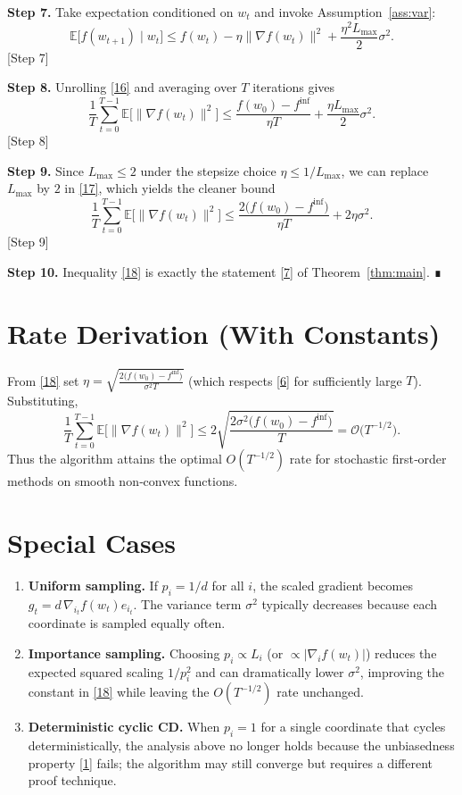 \documentclass[11pt]{article}
\newcommand{\E}{\mathbb{E}}
\begin{document}
\noindent\textbf{Step 7.}  Take expectation conditioned on $w_t$ and invoke
Assumption~\ref{ass:var}:
\[
\E\!\bigl[f(w_{t+1})\mid w_t\bigr]
\le f(w_t)-\eta\|\nabla f(w_t)\|^{2}
+\frac{\eta^{2}L_{\max}}{2}\sigma^{2}.
\tag{16}
\]
[Step 7]

\noindent\textbf{Step 8.}  Unrolling \eqref{16} and averaging over $T$ iterations
gives
\[
\frac{1}{T}\sum_{t=0}^{T-1}\E\!\bigl[\|\nabla f(w_t)\|^{2}\bigr]
\le\frac{f(w_0)-f^{\inf}}{\eta T}
+\frac{\eta L_{\max}}{2}\sigma^{2}.
\tag{17}
\]
[Step 8]

\noindent\textbf{Step 9.}  Since $L_{\max}\le 2$ under the stepsize choice
$\eta\le1/L_{\max}$, we can replace $L_{\max}$ by $2$ in \eqref{17},
which yields the cleaner bound
\[
\frac{1}{T}\sum_{t=0}^{T-1}\E\!\bigl[\|\nabla f(w_t)\|^{2}\bigr]
\le\frac{2\bigl(f(w_0)-f^{\inf}\bigr)}{\eta T}+2\eta\sigma^{2}.
\tag{18}
\]
[Step 9]

\noindent\textbf{Step 10.}  Inequality \eqref{18} is exactly the statement
\eqref{7} of Theorem~\ref{thm:main}.  ∎

\section*{Rate Derivation (With Constants)}
From \eqref{18} set $\eta = \sqrt{\frac{2\bigl(f(w_0)-f^{\inf}\bigr)}{\sigma^{2}T}}$
(which respects \eqref{6} for sufficiently large $T$).  Substituting,
\[
\frac{1}{T}\sum_{t=0}^{T-1}\E\!\bigl[\|\nabla f(w_t)\|^{2}\bigr]
\le 2\sqrt{\frac{2\sigma^{2}\bigl(f(w_0)-f^{\inf}\bigr)}{T}}
= \mathcal{O}\!\bigl(T^{-1/2}\bigr).
\tag{19}
\]
Thus the algorithm attains the optimal $O(T^{-1/2})$ rate for stochastic
first‑order methods on smooth non‑convex functions.

\section*{Special Cases}
\begin{enumerate}[leftmargin=*]
\item \textbf{Uniform sampling.}  If $p_i=1/d$ for all $i$, the scaled
gradient becomes $g_t=d\,\nabla_{i_t}f(w_t)e_{i_t}$.  The variance term
$\sigma^{2}$ typically decreases because each coordinate is sampled
equally often.

\item \textbf{Importance sampling.}  Choosing $p_i\propto L_i$ (or
$\propto |\nabla_i f(w_t)|$) reduces the expected squared scaling
$1/p_i^{2}$ and can dramatically lower $\sigma^{2}$, improving the
constant in \eqref{18} while leaving the $O(T^{-1/2})$ rate unchanged.

\item \textbf{Deterministic cyclic CD.}  When $p_i=1$ for a single
coordinate that cycles deterministically, the analysis above no longer
holds because the unbiasedness property \eqref{1} fails; the algorithm
may still converge but requires a different proof technique.
\end{enumerate}
\end{document}
